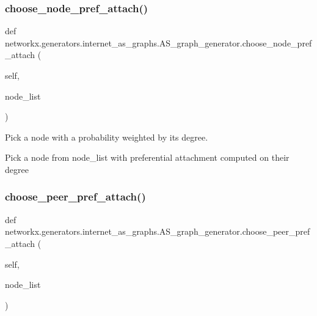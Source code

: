 \subsubsection{\texorpdfstring{choose\+\_\+node\+\_\+pref\+\_\+attach()}{choose\_node\_pref\_attach()}}
{\footnotesize\ttfamily def networkx.\+generators.\+internet\+\_\+as\+\_\+graphs.\+A\+S\+\_\+graph\+\_\+generator.\+choose\+\_\+node\+\_\+pref\+\_\+attach (\begin{DoxyParamCaption}\item[{}]{self,  }\item[{}]{node\+\_\+list }\end{DoxyParamCaption})}

\begin{DoxyVerb}Pick a node with a probability weighted by its degree.

Pick a node from node_list with preferential attachment
computed on their degree
\end{DoxyVerb}
 \mbox{\label{classnetworkx_1_1generators_1_1internet__as__graphs_1_1AS__graph__generator_a3aaae7a61d07306ae4bd050e646e27dd}} 
\subsubsection{\texorpdfstring{choose\+\_\+peer\+\_\+pref\+\_\+attach()}{choose\_peer\_pref\_attach()}}
{\footnotesize\ttfamily def networkx.\+generators.\+internet\+\_\+as\+\_\+graphs.\+A\+S\+\_\+graph\+\_\+generator.\+choose\+\_\+peer\+\_\+pref\+\_\+attach (\begin{DoxyParamCaption}\item[{}]{self,  }\item[{}]{node\+\_\+list }\end{DoxyParamCaption})}

